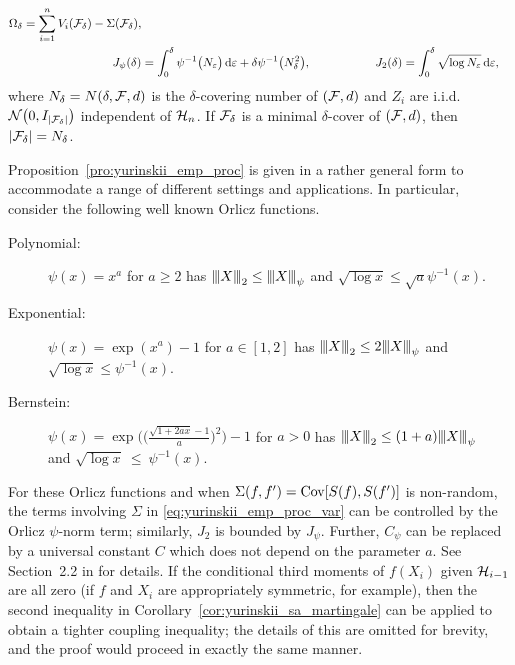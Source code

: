 \begin{proposition}
\begin{align*}
    \Omega_\delta
    =
    \sum_{i=1}^n V_i(\cF_\delta) - \Sigma(\cF_\delta), \\
    J_\psi(\delta)
    &=
    \int_0^\delta \psi^{-1}\big( N_\varepsilon \big)
    \diff{\varepsilon}
    + \delta \psi^{-1} \big( N_\delta^2 \big),
    \hspace*{19mm}
    J_2(\delta)
    = \int_0^\delta \sqrt{\log N_\varepsilon}
    \diff{\varepsilon},
  \end{align*}
  where $N_\delta = N(\delta, \mathcal{F}, d)$
  is the $\delta$-covering number of $(\mathcal{F}, d)$
  and $Z_i$ are i.i.d.\ $\mathcal{N}\big(0, I_{|\mathcal{F}_\delta|}\big)$
  independent of $\mathcal{H}_n$.
  If $\mathcal{F}_\delta$ is a minimal $\delta$-cover
  of $(\mathcal{F}, d)$, then $|\mathcal{F}_\delta| = N_\delta$.
\end{proposition}

Proposition~\ref{pro:yurinskii_emp_proc}
is given in a rather general form to accommodate a range of different
settings and applications.
In particular, consider the following well known Orlicz functions.
%
\begin{description}

  \item[Polynomial:]
    $\psi(x) = x^a$ for $a \geq 2$
    has ${\vert\kern-0.25ex\vert\kern-0.25ex\vert} X {\vert\kern-0.25ex\vert\kern-0.25ex\vert}_2 \leq {\vert\kern-0.25ex\vert\kern-0.25ex\vert} X {\vert\kern-0.25ex\vert\kern-0.25ex\vert}_\psi$ and
    $\sqrt{\log x} \leq \sqrt{a} \psi^{-1}(x)$.

  \item[Exponential:]
    $\psi(x) = \exp(x^a) - 1$ for $a \in [1,2]$
    has ${\vert\kern-0.25ex\vert\kern-0.25ex\vert} X {\vert\kern-0.25ex\vert\kern-0.25ex\vert}_2 \leq 2{\vert\kern-0.25ex\vert\kern-0.25ex\vert} X {\vert\kern-0.25ex\vert\kern-0.25ex\vert}_\psi$ and
    $\sqrt{\log x} \leq \psi^{-1}(x)$.

  \item[Bernstein:]
    $\psi(x) = \exp
    \Big(
      \Big(\frac{\sqrt{1+2ax}-1}{a}\Big)^{2}
    \Big)-1$
    for $a > 0$ has
    ${\vert\kern-0.25ex\vert\kern-0.25ex\vert} X {\vert\kern-0.25ex\vert\kern-0.25ex\vert}_2 \leq (1+a){\vert\kern-0.25ex\vert\kern-0.25ex\vert} X {\vert\kern-0.25ex\vert\kern-0.25ex\vert}_\psi$ \\ and
    $\sqrt{\log x}~\leq~\psi^{-1}(x)$.

\end{description}
%
For these Orlicz functions and when $\Sigma(f, f') = \operatorname{Cov}[S(f), S(f')]$ is
non-random, the terms involving $\Sigma$ in \eqref{eq:yurinskii_emp_proc_var}
can be
controlled by the Orlicz $\psi$-norm term; similarly, $J_2$ is bounded by
$J_\psi$. Further, $C_\psi$ can be replaced by a universal constant $C$ which
does not depend on the parameter $a$. See Section~2.2 in \citet{van1996weak}
for details. If the conditional third moments of $f(X_i)$ given $\mathcal{H}_{i-1}$ are
all zero (if $f$ and $X_i$ are appropriately symmetric, for example), then the
second inequality in Corollary~\ref{cor:yurinskii_sa_martingale} can be applied
to obtain
a tighter coupling inequality; the details of this are omitted for brevity, and
the proof would proceed in exactly the same manner.


